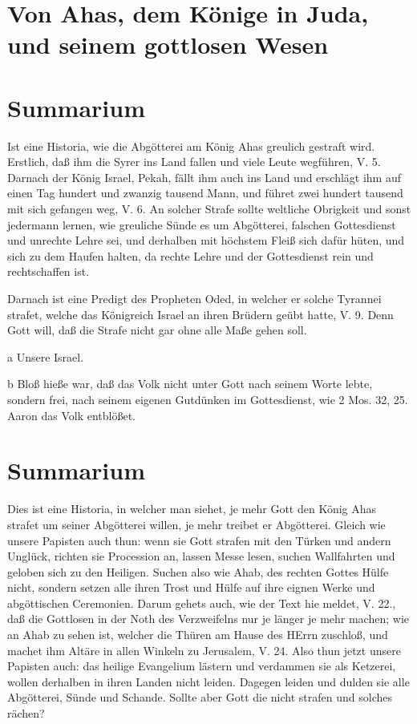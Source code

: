 \section[Von Ahas, dem Könige in Juda, und seinem]{Von Ahas, dem Könige in Juda, und seinem gottlosen Wesen}

\section{Summarium}

Ist eine Historia, wie die Abgötterei am König Ahas greulich gestraft wird. Erstlich, daß ihm die Syrer ins Land fallen und viele Leute wegführen, V. 5. Darnach der König Israel, Pekah, fällt ihm auch ins Land und erschlägt ihm auf einen Tag hundert und zwanzig tausend Mann, und führet zwei hundert tausend mit sich gefangen weg, V. 6. An solcher Strafe sollte weltliche Obrigkeit und sonst jedermann lernen, wie greuliche Sünde es um Abgötterei, falschen Gottesdienst und unrechte Lehre sei, und derhalben mit höchstem Fleiß sich dafür hüten, und sich zu dem Haufen halten, da rechte Lehre und der Gottesdienst rein und rechtschaffen ist.

Darnach ist eine Predigt des Propheten Oded, in welcher er solche Tyrannei strafet, welche das Königreich Israel an ihren Brüdern geübt hatte, V. 9. Denn Gott will, daß die Strafe nicht gar ohne alle Maße gehen soll.

a Unsere Israel.

b Bloß hieße war, daß das Volk nicht unter Gott nach seinem Worte lebte, sondern frei, nach seinem eigenen Gutdünken im Gottesdienst, wie 2 Mos. 32, 25. Aaron das Volk entblößet.

\section{Summarium}

Dies ist eine Historia, in welcher man siehet, je mehr Gott den König Ahas strafet um seiner
Abgötterei willen, je mehr treibet er Abgötterei. Gleich wie unsere Papisten auch thun: wenn sie Gott strafen mit den Türken und andern Unglück, richten sie Procession an, lassen Messe lesen, suchen Wallfahrten und geloben sich zu den Heiligen. Suchen also wie Ahab, des rechten Gottes Hülfe nicht, sondern setzen alle ihren Trost und Hülfe auf ihre eignen Werke und abgöttischen Ceremonien. Darum gehets auch, wie der Text hie meldet, V. 22., daß die Gottlosen in der Noth des Verzweifelns nur je länger je mehr machen; wie an Ahab zu sehen ist, welcher die Thüren am Hause des HErrn zuschloß, und machet ihm Altäre in allen Winkeln zu Jerusalem, V. 24. Also thun jetzt unsere Papisten auch: das heilige Evangelium lästern und verdammen sie als Ketzerei, wollen derhalben in ihren Landen nicht leiden. Dagegen leiden und dulden sie alle Abgötterei, Sünde und Schande. Sollte aber Gott die nicht strafen und solches rächen?

